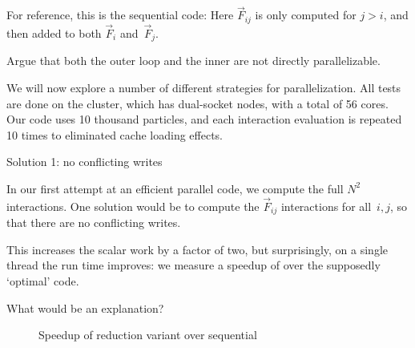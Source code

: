 For reference, this is the sequential code:
Here $\overrightarrow F_{ij}$ is only computed for $j>i$, and then
added to both $\overrightarrow F_i$ and~$\overrightarrow F_j$.

\begin{exercise}
  Argue that both the outer loop and the inner are not directly parallelizable.
\end{exercise}

We will now explore a number of different strategies for parallelization.
All tests are done on the  cluster,
which has dual-socket  nodes,
with a total of 56 cores.
Our code uses 10 thousand particles, and each interaction evaluation
is repeated 10 times to eliminated cache loading effects.

 {Solution 1: no conflicting writes}

In our first attempt at an efficient parallel code,
we compute the full $N^2$ interactions.
One solution would be to compute the $\overrightarrow F_{ij}$
interactions for all~$i,j$,
so that there are no conflicting writes.


This increases the scalar work by a factor of two,
but surprisingly, on a single thread the run time improves:
we measure a speedup of  over the supposedly `optimal' code.

\begin{exercise}
  What would be an explanation?
\end{exercise}

\begin{figure}[t]
  \caption{{Speedup of reduction variant over sequential}}
  \label{fig:omp-nbody1}
\end{figure}

